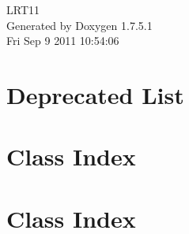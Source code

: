 \documentclass[a4paper]{book}
\begin{document}
\hypersetup{pageanchor=false,citecolor=blue}
\begin{titlepage}
\vspace*{7cm}
\begin{center}
{\Large \-L\-R\-T11 }\\
\vspace*{1cm}
{\large \-Generated by Doxygen 1.7.5.1}\\
\vspace*{0.5cm}
{\small Fri Sep 9 2011 10:54:06}\\
\end{center}
\end{titlepage}
\clearemptydoublepage
{}
\tableofcontents
\clearemptydoublepage
{}
\hypersetup{pageanchor=true,citecolor=blue}
\chapter{\-Deprecated \-List}
\label{deprecated}
\hypertarget{deprecated}{}

\chapter{\-Class \-Index}

\chapter{\-Class \-Index}

\end{document}
